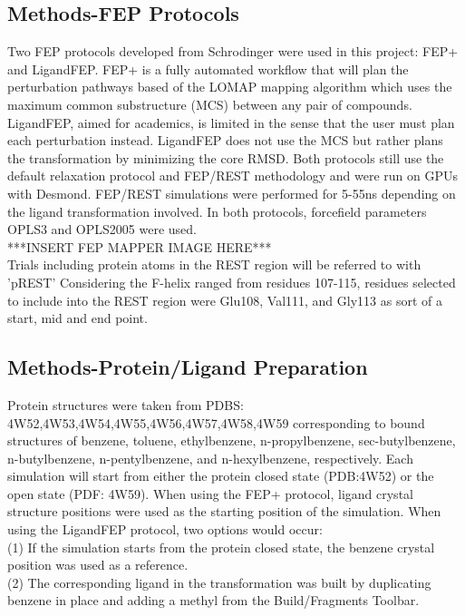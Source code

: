 \documentclass{article}
\begin{document}
\subsection{Methods-FEP Protocols}
Two FEP protocols developed from Schrodinger were used in this project: FEP+ and LigandFEP.
FEP+ is a fully automated workflow that will plan the perturbation pathways based of the LOMAP mapping algorithm which uses the maximum common substructure (MCS) between any pair of compounds.
LigandFEP, aimed for academics, is limited in the sense that the user must plan each perturbation instead.
LigandFEP does not use the MCS but rather plans the transformation by minimizing the core RMSD.
Both protocols still use the default relaxation protocol and FEP/REST methodology and were run on GPUs with Desmond.
FEP/REST simulations were performed for 5-55ns depending on the ligand transformation involved.
In both protocols, forcefield parameters OPLS3 and OPLS2005 were used.\\

***INSERT FEP MAPPER IMAGE HERE***\\

Trials including protein atoms in the REST region will be referred to with 'pREST'
Considering the F-helix ranged from residues 107-115, residues selected to include into the REST region were Glu108, Val111, and Gly113 as sort of a start, mid and end point.

\subsection{Methods-Protein/Ligand Preparation}
Protein structures were taken from PDBS: 4W52,4W53,4W54,4W55,4W56,4W57,4W58,4W59 corresponding to bound structures of benzene, toluene, ethylbenzene, n-propylbenzene, sec-butylbenzene, n-butylbenzene, n-pentylbenzene, and n-hexylbenzene, respectively.
Each simulation will start from either the protein closed state (PDB:4W52) or the open state (PDF: 4W59).
When using the FEP+ protocol, ligand crystal structure positions were used as the starting position of the simulation.
When using the LigandFEP protocol, two options would occur:\\
(1) If the simulation starts from the protein closed state, the benzene crystal position was used as a reference.\\
(2) The corresponding ligand in the transformation was built by duplicating benzene in place and adding a methyl from the Build/Fragments Toolbar.\\
\end{document}
